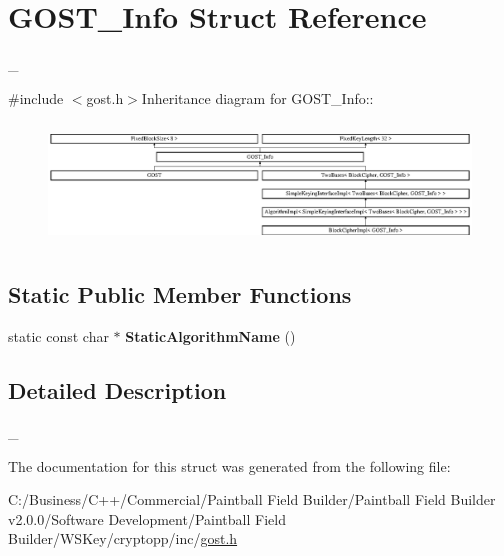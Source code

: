\hypertarget{struct_g_o_s_t___info}{
\section{GOST\_\-Info Struct Reference}
\label{struct_g_o_s_t___info}
}


\_\-  


{\ttfamily \#include $<$gost.h$>$}Inheritance diagram for GOST\_\-Info::\begin{figure}[H]
\begin{center}
\leavevmode
\includegraphics[height=3.28125cm]{struct_g_o_s_t___info}
\end{center}
\end{figure}
\subsection*{Static Public Member Functions}
\begin{DoxyCompactItemize}
\item 
\hypertarget{struct_g_o_s_t___info_a9802cbd08274bc448b6997cd145fb17f}{
static const char $\ast$ {\bfseries StaticAlgorithmName} ()}
\label{struct_g_o_s_t___info_a9802cbd08274bc448b6997cd145fb17f}

\end{DoxyCompactItemize}


\subsection{Detailed Description}
\_\- 

The documentation for this struct was generated from the following file:\begin{DoxyCompactItemize}
\item 
C:/Business/C++/Commercial/Paintball Field Builder/Paintball Field Builder v2.0.0/Software Development/Paintball Field Builder/WSKey/cryptopp/inc/\hyperlink{gost_8h}{gost.h}\end{DoxyCompactItemize}

